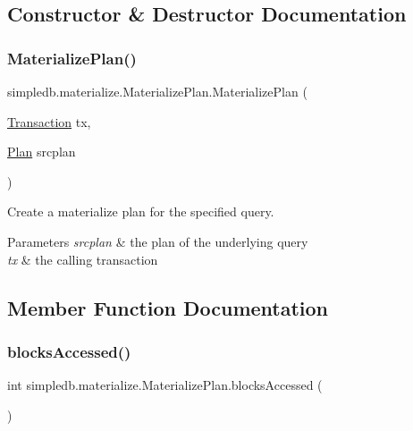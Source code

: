 \subsection{Constructor \& Destructor Documentation}
\mbox{\label{classsimpledb_1_1materialize_1_1MaterializePlan_afbbc97c880a46462da0ed153828a33fb}} 
\subsubsection{\texorpdfstring{Materialize\+Plan()}{MaterializePlan()}}
{\footnotesize\ttfamily simpledb.\+materialize.\+Materialize\+Plan.\+Materialize\+Plan (\begin{DoxyParamCaption}\item[{\hyperlink{classsimpledb_1_1tx_1_1Transaction}{Transaction}}]{tx,  }\item[{\hyperlink{interfacesimpledb_1_1plan_1_1Plan}{Plan}}]{srcplan }\end{DoxyParamCaption})\hspace{0.3cm}{\ttfamily [inline]}}

Create a materialize plan for the specified query. 
\begin{DoxyParams}{Parameters}
{\em srcplan} & the plan of the underlying query \\
\hline
{\em tx} & the calling transaction \\
\hline
\end{DoxyParams}


\subsection{Member Function Documentation}
\mbox{\label{classsimpledb_1_1materialize_1_1MaterializePlan_a17e5dc3ecdd3ea848ad34c796f988da1}} 
\subsubsection{\texorpdfstring{blocks\+Accessed()}{blocksAccessed()}}
{\footnotesize\ttfamily int simpledb.\+materialize.\+Materialize\+Plan.\+blocks\+Accessed (\begin{DoxyParamCaption}{ }\end{DoxyParamCaption})\hspace{0.3cm}{\ttfamily [inline]}}

